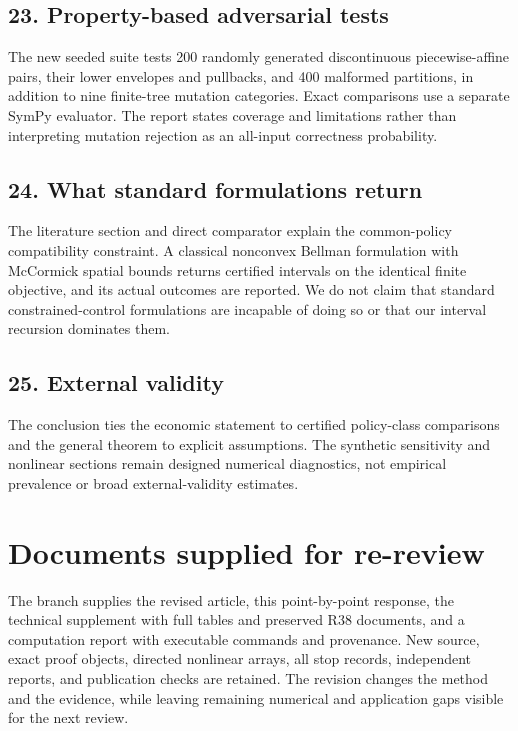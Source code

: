 \subsection{23. Property-based adversarial tests}
The new seeded suite tests 200 randomly generated discontinuous piecewise-affine pairs, their lower envelopes and pullbacks, and 400 malformed partitions, in addition to nine finite-tree mutation categories. Exact comparisons use a separate SymPy evaluator. The report states coverage and limitations rather than interpreting mutation rejection as an all-input correctness probability.
\subsection{24. What standard formulations return}
The literature section and direct comparator explain the common-policy compatibility constraint. A classical nonconvex Bellman formulation with McCormick spatial bounds returns certified intervals on the identical finite objective, and its actual outcomes are reported. We do not claim that standard constrained-control formulations are incapable of doing so or that our interval recursion dominates them.
\subsection{25. External validity}
The conclusion ties the economic statement to certified policy-class comparisons and the general theorem to explicit assumptions. The synthetic sensitivity and nonlinear sections remain designed numerical diagnostics, not empirical prevalence or broad external-validity estimates.

\section{Documents supplied for re-review}
The branch supplies the revised article, this point-by-point response, the technical supplement with full tables and preserved R38 documents, and a computation report with executable commands and provenance. New source, exact proof objects, directed nonlinear arrays, all stop records, independent reports, and publication checks are retained. The revision changes the method and the evidence, while leaving remaining numerical and application gaps visible for the next review.

